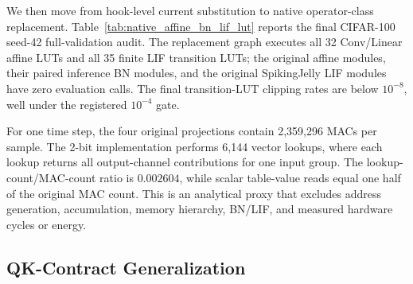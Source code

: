 We then move from hook-level current substitution to native operator-class
replacement. Table~\ref{tab:native_affine_bn_lif_lut} reports the final
CIFAR-100 seed-42 full-validation audit. The replacement graph executes all 32
Conv/Linear affine LUTs and all 35 finite LIF transition LUTs; the original
affine modules, their paired inference BN modules, and the original
SpikingJelly LIF modules have zero evaluation calls. The final transition-LUT
clipping rates are below $10^{-8}$, well under the registered $10^{-4}$ gate.

\begin{table}[H]
\centering
\footnotesize
{}
\caption{Native learned-affine, BN-folded, and finite LIF-transition LUT
replacement. Both rows use seed 42 and full validation. The graph removes all
32 Conv/Linear affine operators, all 31 paired inference BN modules, and all 35
LIF state transitions from the evaluated runtime path. This establishes
operator-class replacement fidelity for learned affine/BN/LIF components, not
replacement of pooling, residual additions, SSA matrix products/gating, global
reductions, or measured hardware execution.}
\label{tab:native_affine_bn_lif_lut}
\end{table}

For one time step, the four original projections contain 2,359,296 MACs per
sample. The 2-bit implementation performs 6,144 vector lookups, where each
lookup returns all output-channel contributions for one input group. The
lookup-count/MAC-count ratio is $0.002604$, while scalar table-value reads equal
one half of the original MAC count. This is an analytical proxy that excludes
address generation, accumulation, memory hierarchy, BN/LIF, and measured
hardware cycles or energy.

\subsection{QK-Contract Generalization}
\label{sec:cross_arch_generalization}

